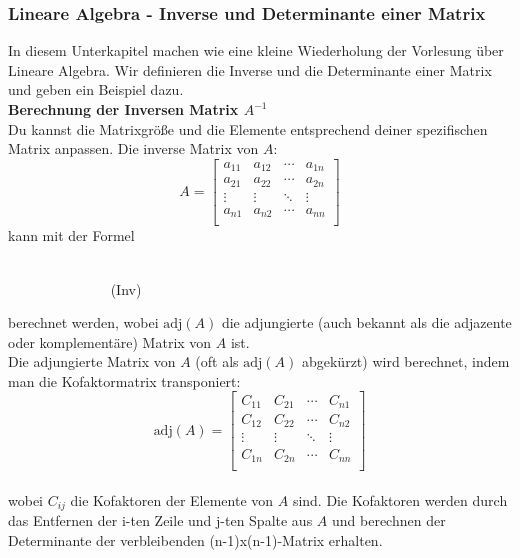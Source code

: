 \documentclass[12pt]{article}
\begin{document}
\subsubsection{Lineare Algebra - Inverse und Determinante einer Matrix}
In diesem Unterkapitel machen wie eine kleine Wiederholung der Vorlesung über Lineare Algebra. Wir definieren die Inverse und die Determinante einer Matrix und geben ein Beispiel dazu. \\[0.3cm]
\textbf{Berechnung der Inversen Matrix $A^{-1}$}\\[0.2cm]
Du kannst die Matrixgröße und die Elemente entsprechend deiner spezifischen Matrix anpassen. Die inverse Matrix von $A$:
\[
A = \begin{bmatrix}
    a_{11} & a_{12} & \cdots & a_{1n} \\
    a_{21} & a_{22} & \cdots & a_{2n} \\
    \vdots & \vdots & \ddots & \vdots \\
    a_{n1} & a_{n2} & \cdots & a_{nn} \\
\end{bmatrix}
\]
kann mit der Formel
\begin{large}
\\[0.5cm]
\hspace*{4.0cm}
\colorbox{blue}{} $ \qquad \qquad \qquad \quad $ (Inv)\\[0.6cm]
\end{large}
% 
berechnet werden, wobei $\text{adj}(A)$ die adjungierte (auch bekannt als die adjazente oder komplementäre) Matrix von $A$ ist.\\
%
Die adjungierte Matrix von $A$ (oft als $\text{adj}(A)$ abgekürzt) wird berechnet, indem man die Kofaktormatrix transponiert:
\[
\text{adj}(A) = \begin{bmatrix}
    C_{11} & C_{21} & \cdots & C_{n1} \\
    C_{12} & C_{22} & \cdots & C_{n2} \\
    \vdots & \vdots & \ddots & \vdots \\
    C_{1n} & C_{2n} & \cdots & C_{nn} \\
\end{bmatrix}
\]
\\[0.4cm]
wobei $C_{ij}$ die Kofaktoren der Elemente von $A$ sind. Die Kofaktoren werden durch das Entfernen der i-ten Zeile und j-ten Spalte aus $A$ und berechnen der Determinante der verbleibenden (n-1)x(n-1)-Matrix erhalten.\\[0.8cm]
\end{document}
